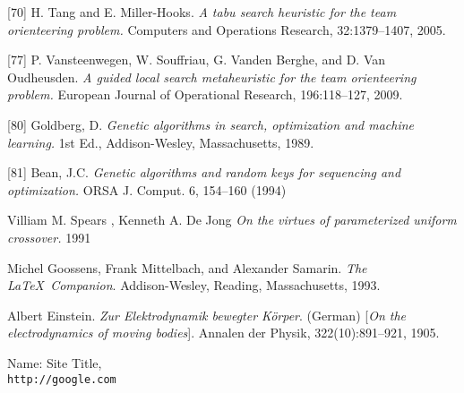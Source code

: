 \begin{thebibliography}{9}
[70] H. Tang and E. Miller-Hooks.
\textit{A tabu search heuristic for the team orienteering problem.}
Computers and Operations Research, 32:1379–1407, 2005.

[77] P. Vansteenwegen, W. Souffriau, G. Vanden Berghe, and D. Van Oudheusden.
\textit{A guided local search metaheuristic for the team orienteering problem.}
European Journal of Operational Research, 196:118–127, 2009.

[80] Goldberg, D.
\textit{Genetic algorithms in search, optimization and machine learning.}
1st Ed., Addison-Wesley, Massachusetts, 1989.

[81] Bean, J.C.
\textit{Genetic algorithms and random keys for sequencing and optimization.}
ORSA J. Comput. 6, 154–160 (1994)

Villiam M. Spears , Kenneth A. De Jong
\textit{On the virtues of parameterized uniform crossover.}
1991




Michel Goossens, Frank Mittelbach, and Alexander Samarin. 
\textit{The \LaTeX\ Companion}. 
Addison-Wesley, Reading, Massachusetts, 1993.
 
Albert Einstein. 
\textit{Zur Elektrodynamik bewegter K{\"o}rper}. (German) 
[\textit{On the electrodynamics of moving bodies}]. 
Annalen der Physik, 322(10):891–921, 1905.
 
Name: Site Title,
\\\texttt{http://google.com}
\end{thebibliography}

